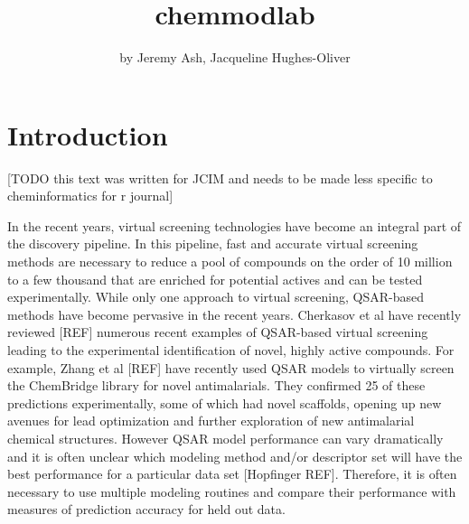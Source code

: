 \title{chemmodlab}
\author{by Jeremy Ash, Jacqueline Hughes-Oliver}

\maketitle


\section{Introduction}\label{introduction}

{[}TODO this text was written for JCIM and needs to be made less
specific to cheminformatics for r journal{]}

In the recent years, virtual screening technologies have become an
integral part of the discovery pipeline. In this pipeline, fast and
accurate virtual screening methods are necessary to reduce a pool of
compounds on the order of 10 million to a few thousand that are enriched
for potential actives and can be tested experimentally. While only one
approach to virtual screening, QSAR-based methods have become pervasive
in the recent years. Cherkasov et al have recently reviewed {[}REF{]}
numerous recent examples of QSAR-based virtual screening leading to the
experimental identification of novel, highly active compounds. For
example, Zhang et al {[}REF{]} have recently used QSAR models to
virtually screen the ChemBridge library for novel antimalarials. They
confirmed 25 of these predictions experimentally, some of which had
novel scaffolds, opening up new avenues for lead optimization and
further exploration of new antimalarial chemical structures. However
QSAR model performance can vary dramatically and it is often unclear
which modeling method and/or descriptor set will have the best
performance for a particular data set {[}Hopfinger REF{]}. Therefore, it
is often necessary to use multiple modeling routines and compare their
performance with measures of prediction accuracy for held out data.

